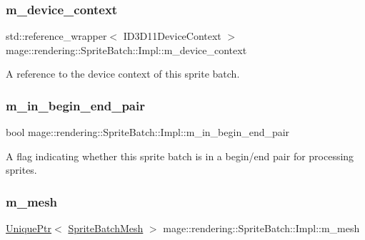 \subsubsection{\texorpdfstring{m\+\_\+device\+\_\+context}{m\_device\_context}}
{\footnotesize\ttfamily std\+::reference\+\_\+wrapper$<$ I\+D3\+D11\+Device\+Context $>$ mage\+::rendering\+::\+Sprite\+Batch\+::\+Impl\+::m\+\_\+device\+\_\+context\hspace{0.3cm}{\ttfamily [private]}}

A reference to the device context of this sprite batch. \hypertarget{classmage_1_1rendering_1_1_sprite_batch_1_1_impl_ad498fe3044bbf1c303119ad4d8edcf7b}{}\label{classmage_1_1rendering_1_1_sprite_batch_1_1_impl_ad498fe3044bbf1c303119ad4d8edcf7b} 
\subsubsection{\texorpdfstring{m\+\_\+in\+\_\+begin\+\_\+end\+\_\+pair}{m\_in\_begin\_end\_pair}}
{\footnotesize\ttfamily bool mage\+::rendering\+::\+Sprite\+Batch\+::\+Impl\+::m\+\_\+in\+\_\+begin\+\_\+end\+\_\+pair\hspace{0.3cm}{\ttfamily [private]}}

A flag indicating whether this sprite batch is in a begin/end pair for processing sprites. \hypertarget{classmage_1_1rendering_1_1_sprite_batch_1_1_impl_a6ea37418810939906de6614c6233b4be}{}\label{classmage_1_1rendering_1_1_sprite_batch_1_1_impl_a6ea37418810939906de6614c6233b4be} 
\subsubsection{\texorpdfstring{m\+\_\+mesh}{m\_mesh}}
{\footnotesize\ttfamily \hyperlink{namespacemage_a3316d7143a973e37adf1110f2e80ca31}{Unique\+Ptr}$<$ \hyperlink{classmage_1_1rendering_1_1_sprite_batch_mesh}{Sprite\+Batch\+Mesh} $>$ mage\+::rendering\+::\+Sprite\+Batch\+::\+Impl\+::m\+\_\+mesh\hspace{0.3cm}{\ttfamily [private]}}

